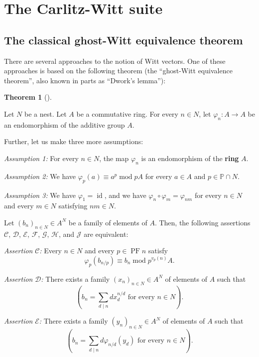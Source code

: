 \documentclass[numbers=enddot,12pt,final,onecolumn,notitlepage]{scrartcl}%
\theoremstyle{definition}
\newtheorem{theo}{Theorem}[section]
\newenvironment{theorem}[1][]
{\begin{theo}[#1]\begin{leftbar}}
{\end{leftbar}\end{theo}}
\let\sumnonlimits\sum
\renewcommand{\sum}{\sumnonlimits\limits}
\begin{document}
\section{\label{sect.carlitzwitt}The Carlitz-Witt suite}

\subsection{The classical ghost-Witt equivalence theorem}

There are several approaches to the notion of Witt vectors. One of these
approaches is based on the following theorem (the ``ghost-Witt equivalence
theorem'', also known in parts as \textquotedblleft Dwork's
lemma\textquotedblright):

\begin{theorem}
\label{thm.gW}Let $N$ be a nest. Let $A$ be a commutative ring. For every
$n\in N$, let $\varphi_{n}:A\rightarrow A$ be an endomorphism of the additive
group $A$.

Further, let us make three more assumptions:

\textit{Assumption 1:} For every $n\in N$, the map $\varphi_{n}$ is an
endomorphism of the \textbf{ring} $A$.

\textit{Assumption 2:} We have $\varphi_{p}\left(  a\right)  \equiv
a^{p}\operatorname{mod}pA$ for every $a\in A$ and $p\in\mathbb{P}\cap N$.

\textit{Assumption 3:} We have $\varphi_{1}=\operatorname*{id}$, and we have
$\varphi_{n}\circ\varphi_{m}=\varphi_{nm}$ for every $n\in N$ and every $m\in
N$ satisfying $nm\in N$.

Let $\left(  b_{n}\right)  _{n\in N}\in A^{N}$ be a family of elements of $A$.
Then, the following assertions $\mathcal{C}$, $\mathcal{D}$, $\mathcal{E}$,
$\mathcal{F}$, $\mathcal{G}$, $\mathcal{H}$, and $\mathcal{J}$ are equivalent:

\textit{Assertion }$\mathcal{C}$\textit{:} Every $n\in N$ and every
$p\in\operatorname{PF}n$ satisfy%
\[
\varphi_{p}\left(  b_{n / p}\right)  \equiv b_{n}\operatorname{mod}%
p^{v_{p}\left(  n\right)  }A.
\]


\textit{Assertion }$\mathcal{D}$\textit{:} There exists a family $\left(
x_{n}\right)  _{n\in N}\in A^{N}$ of elements of $A$ such that%
\[
\left(  b_{n}=\sum_{d\mid n}dx_{d}^{n / d}\text{ for every }n\in N\right)  .
\]


\textit{Assertion }$\mathcal{E}$\textit{:} There exists a family $\left(
y_{n}\right)  _{n\in N}\in A^{N}$ of elements of $A$ such that%
\[
\left(  b_{n}=\sum_{d\mid n}d\varphi_{n / d}\left(  y_{d}\right)  \text{ for
every }n\in N\right)  .
\]



\end{theorem}
\end{document}
